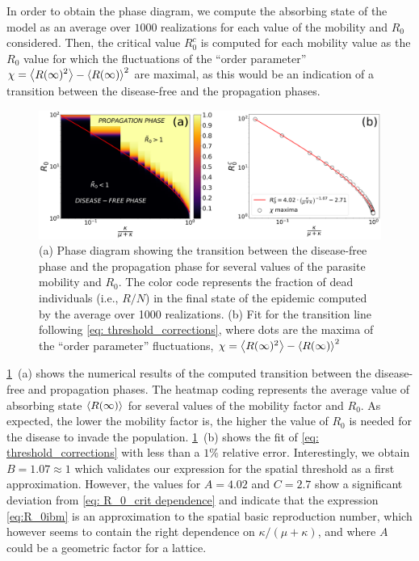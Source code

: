 In order to obtain the phase diagram, we compute the absorbing state of the
model as an average over $1000$ realizations for each value of the mobility and
$R_0$ considered. Then, the critical value $R_0^c$ is computed for each
mobility value as the $R_0$ value for which the fluctuations of the ``order
parameter'' $\displaystyle \chi=\left<{R(\infty})^2\right>-\left<R(\infty)\right>^2$ are
maximal, as this would be an indication of a transition between the
disease-free and the propagation phases.

\begin{figure}[H]
    \centering
    \includegraphics[width=1\textwidth]{Figures/PhaseDiagram.png}
    \caption[Phase diagram and fit for the transition between the disease-free
        and propagation phases]{(a) Phase diagram showing the transition
        between the disease-free phase and the propagation phase for several
        values of the parasite mobility and $R_0$. The color code represents
        the fraction of dead individuals (i.e., $R/N$) in the final state of
        the
        epidemic computed by the average over 1000 realizations. (b) Fit for
        the transition line following \cref{eq: threshold_corrections}, where
        dots are the maxima of the ``order parameter'' fluctuations,
        $\chi=\left<{R(\infty})^2\right>-\left<R(\infty)\right>^2$}
    \label{fig:Phase_diagram}
\end{figure}

\cref{fig:Phase_diagram}~\textcolor{ref_color}{(a)} shows the numerical results
of the computed
transition between the disease-free and propagation phases. The heatmap coding
represents the average value of absorbing state $\left<R(\infty)\right>$ for several
values of the mobility factor and $R_0$. As expected, the lower the mobility
factor is, the higher the value of $R_0$ is needed for the disease to invade
the population. \cref{fig:Phase_diagram}~\textcolor{ref_color}{(b)} shows the
fit of \cref{eq:
    threshold_corrections} with less than a $1\%$ relative error.
Interestingly, we obtain $B=1.07\approx1$ which validates our expression for
the spatial threshold as a first approximation. However, the values for
$A=4.02$ and $C=2.7$ show a significant deviation from \cref{eq: R_0_crit
    dependence} and indicate that the expression \cref{eq:R_0ibm} is  an
approximation to the spatial basic reproduction number, which however seems to
contain the right dependence on $\kappa/(\mu+\kappa)$, and where $A$ could be a
geometric factor for a lattice.

